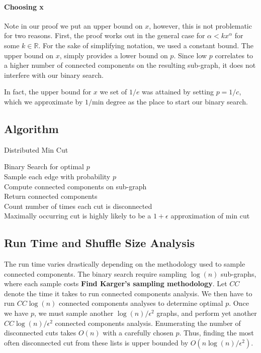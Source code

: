 \documentclass[12pt]{article}
\begin{document}
\paragraph{Choosing x}

Note in our proof we put an upper bound on $x$, however, this is not problematic for two reasons. First, the proof works out in the general case for $\alpha < kx^\alpha$ for some $k \in \mathbb{R}$. For the sake of simplifying notation, we used a constant bound. The upper bound on $x$, simply provides a lower bound on $p$. Since low $p$ correlates to a higher number of connected components on the resulting sub-graph, it does not interfere with our binary search.

In fact, the upper bound for $x$ we set of $1/e$ was attained by setting $p = 1/c$, which we approximate by $1/\text{min degree}$ as the place to start our binary search.

\subsection{Algorithm}

\LinesNumbered
\begin{algorithm}[H]
\caption{Distributed Min Cut}
Binary Search for optimal $p$ \\
\IP{}
{
  Sample each edge with probability $p$ \\
  Compute connected components on sub-graph \\
  Return connected components \\
}
Count number of times each cut is disconnected \\
Maximally occurring cut is highly likely to be a $1+\epsilon$ approximation of min cut
\end{algorithm}


\subsection{Run Time and Shuffle Size Analysis}

The run time varies drastically depending on the methodology used to sample connected components. The binary search require sampling $\log(n)$ sub-graphs, where each sample costs \textbf{Find Karger's sampling methodology}. Let $CC$ denote the time it takes to run connected components analysis. We then have to run $CC \log(n)$ connected components analyses to determine optimal $p$. Once we have $p$, we must sample another $\log(n)/\epsilon^2$ graphs, and perform yet another $CC \log(n)/\epsilon^2$ connected components analysis. Enumerating the number of disconnected cuts takes $O(n)$ with a carefully chosen $p$. Thus, finding the most often disconnected cut from these lists is upper bounded by $O(n\log(n)/\epsilon^2)$.
\end{document}
